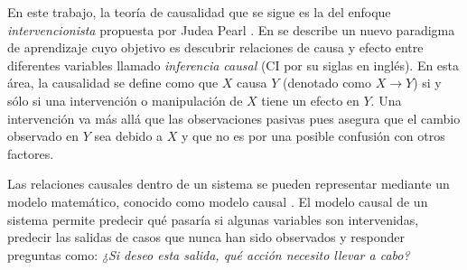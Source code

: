 En este trabajo, la teoría
de causalidad que se sigue es la del enfoque \textit{intervencionista} propuesta
por Judea Pearl \cite{pearl2010introduction} \cite{sep-causal-models}.
En \cite{pearl2018bookofwhy} se describe un
nuevo paradigma de aprendizaje cuyo objetivo es descubrir relaciones de causa y efecto entre diferentes variables llamado \textit{inferencia causal} (CI por su siglas en inglés).
En esta área, la causalidad se define
como que $X$ causa $Y$ (denotado como $X \rightarrow Y$) si
y sólo si una intervención 
o manipulación de $X$ tiene un 
efecto en $Y$\cite{doi:10.1063/1.5025050}.
Una intervención va más allá que las observaciones pasivas pues asegura que el cambio
observado en $Y$ sea debido a $X$ y que no
es por una posible confusión con otros factores.

Las relaciones causales dentro de un sistema se pueden representar mediante un modelo matemático, conocido como modelo causal \cite{sep-causal-models}.
El modelo causal de un sistema
permite predecir qué pasaría si algunas
variables son intervenidas, predecir las salidas de casos que nunca han sido observados \cite{chaochao_2019} y responder preguntas como:
\textit{¿Si deseo esta salida, qué acción necesito
llevar a cabo?}











